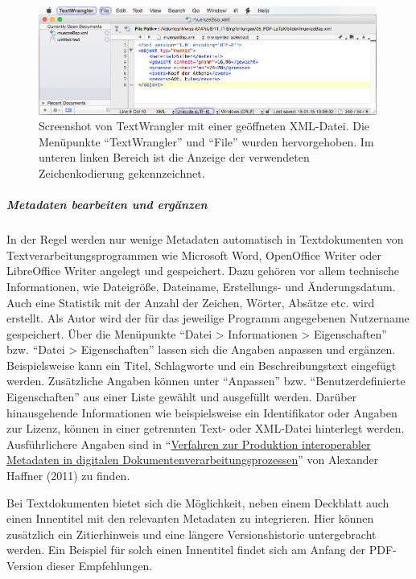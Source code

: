 \begin{figure}[htb!]
  \begin{center}
    \includegraphics[width=0.99\textwidth]{bilder/text_wranglerMarkierung}
  \end{center}
  \caption{Screenshot von TextWrangler mit einer geöffneten XML-Datei. Die Menüpunkte "`TextWrangler"' und "`File"' wurden hervorgehoben. Im unteren linken Bereich ist die Anzeige der verwendeten Zeichenkodierung gekennzeichnet.}
  \label{abb:text-wrangler}
\end{figure}


\subparagraph{Metadaten bearbeiten und ergänzen}
In der Regel werden nur wenige Metadaten automatisch in Textdokumenten von Textverarbeitungsprogrammen wie Microsoft Word, OpenOffice Writer oder LibreOffice Writer angelegt und gespeichert. Dazu gehören vor allem technische Informationen, wie Dateigröße, Dateiname, Erstellungs- und Änderungsdatum. Auch eine Statistik mit der Anzahl der Zeichen, Wörter, Absätze etc. wird erstellt. Als Autor wird der für das jeweilige Programm angegebenen Nutzername gespeichert. Über die Menüpunkte "`Datei > Informationen > Eigenschaften"' bzw. "`Datei > Eigenschaften"' lassen sich die Angaben anpassen und ergänzen. Beispielsweise kann ein Titel, Schlagworte und ein Beschreibungstext eingefügt werden. Zusätzliche Angaben können unter "`Anpassen"' bzw. "`Benutzerdefinierte Eigenschaften"' aus einer Liste gewählt und ausgefüllt werden. Darüber hinausgehende Informationen wie beispielsweise ein Identifikator oder Angaben zur Lizenz, können in einer getrennten Text- oder XML-Datei hinterlegt werden. Ausführlichere Angaben sind in "`\href{http://www.kim-forum.org/Subsites/kim/DE/Materialien/Dokumente/dokumente_node.html\#doc42066bodyText7}{Verfahren zur Produktion interoperabler Metadaten in digitalen Dokumentenverarbeitungsprozessen}"' von Alexander Haffner (2011) zu finden.

Bei Textdokumenten bietet sich die Möglichkeit, neben einem Deckblatt auch einen Innentitel mit den relevanten Metadaten zu integrieren. Hier können zusätzlich ein Zitierhinweis und eine längere Versionshistorie untergebracht werden. Ein Beispiel für solch einen Innentitel findet sich am Anfang der PDF-Version dieser Empfehlungen.

